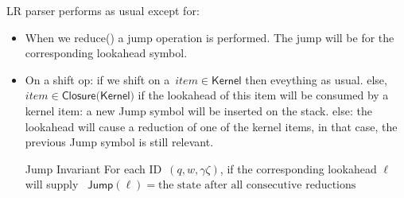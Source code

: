 LR parser performs as usual except for:

\begin{itemize}
	\item When we \textsf{reduce()} a jump operation is performed.
	  The jump will be for the corresponding lookahead symbol.
	  
	\item On a shift op:
	if we shift on a~$item \in \textsf{Kernel}$
	  then eveything as usual.
	else,~$item \in \textsf{Closure(Kernel)}$
	    if the lookahead of this item will be consumed by a kernel item:
	      a new Jump symbol will be inserted on the stack.
	    else:
	      the lookahead will cause a reduction of one of the kernel items,
	      in that case, the previous Jump symbol is still relevant.
	\item[Jump Invariant] For each ID~$(q,w,\gamma \zeta)$, if the corresponding lookahead $\ell$ will supply
	  ~$\textsf{Jump}(\ell)= \text{the state after all consecutive reductions}$
\end{itemize}

